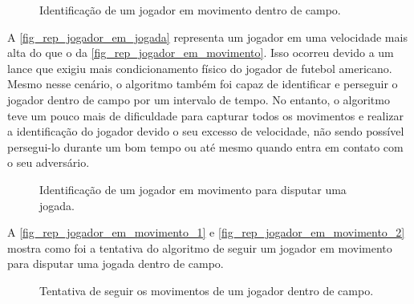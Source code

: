 
\begin{figure}[ht]
	\caption{\label{fig_rep_jogador_em_movimento}Identificação de um jogador em movimento dentro de campo.}
	\begin{center}
	\end{center}
	\centering {}
\end{figure}

A \autoref{fig_rep_jogador_em_jogada} representa um jogador em uma velocidade mais alta do que o da \autoref{fig_rep_jogador_em_movimento}. Isso ocorreu devido a um lance que exigiu mais condicionamento físico do jogador de futebol americano. Mesmo nesse cenário, o algoritmo também foi capaz de identificar e perseguir o jogador dentro de campo por um intervalo de tempo. No entanto, o algoritmo teve um pouco mais de dificuldade para capturar todos os movimentos e realizar a identificação do  jogador devido o seu excesso de velocidade, não sendo possível persegui-lo durante um bom tempo ou até mesmo quando entra em contato com o seu adversário.


\begin{figure}[ht]
	\caption{\label{fig_rep_jogador_em_jogada}Identificação de um jogador em movimento para disputar uma jogada.}
	\begin{center}
	\end{center}
	\centering {}
\end{figure}

A \autoref{fig_rep_jogador_em_movimento_1} e \autoref{fig_rep_jogador_em_movimento_2} mostra como foi a tentativa do algoritmo de seguir um jogador em movimento para disputar uma jogada dentro de campo.

\begin{figure}[ht]
	\caption{\label{fig_rep_jogador_em_movimento_1}Tentativa de seguir os movimentos de um jogador dentro de campo.}
	\begin{center}
	\end{center}
	\centering {}
\end{figure}

